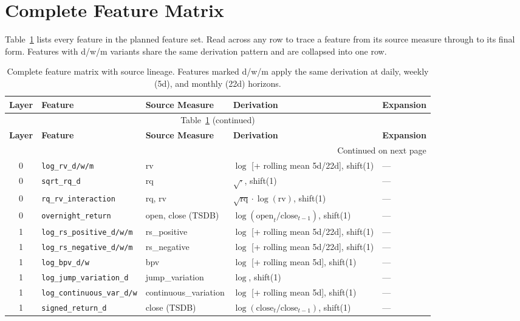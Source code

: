 \section{Complete Feature Matrix}
\label{sec:feature-matrix}

Table~\ref{tab:feature-matrix} lists every feature in the planned feature set.
Read across any row to trace a feature from its source measure through to its final form.
Features with d/w/m variants share the same derivation pattern and are collapsed into one row.

{\scriptsize
\begin{longtable}{@{}cl p{2.4cm} p{4.6cm} l@{}}
\caption{Complete feature matrix with source lineage.
Features marked d/w/m apply the same derivation at daily, weekly (5d), and monthly (22d) horizons.}
\label{tab:feature-matrix} \\
\toprule
\textbf{Layer} & \textbf{Feature} & \textbf{Source Measure} & \textbf{Derivation} & \textbf{Expansion} \\
\midrule
\endfirsthead
\multicolumn{5}{c}{\small Table~\ref{tab:feature-matrix} (continued)} \\
\toprule
\textbf{Layer} & \textbf{Feature} & \textbf{Source Measure} & \textbf{Derivation} & \textbf{Expansion} \\
\midrule
\endhead
\midrule \multicolumn{5}{r}{\small Continued on next page} \\
\endfoot
\bottomrule
\endlastfoot

0 & \texttt{log\_rv\_d/w/m} & rv & $\log$ [+ rolling mean 5d/22d], shift(1) & --- \\
0 & \texttt{sqrt\_rq\_d} & rq & $\sqrt{\cdot}$, shift(1) & --- \\
0 & \texttt{rq\_rv\_interaction} & rq, rv & $\sqrt{\text{rq}} \cdot \log(\text{rv})$, shift(1) & --- \\
0 & \texttt{overnight\_return} & open, close (TSDB) & $\log(\text{open}_t / \text{close}_{t-1})$, shift(1) & --- \\
\midrule

1 & \texttt{log\_rs\_positive\_d/w/m} & rs\_positive & $\log$ [+ rolling mean 5d/22d], shift(1) & --- \\
1 & \texttt{log\_rs\_negative\_d/w/m} & rs\_negative & $\log$ [+ rolling mean 5d/22d], shift(1) & --- \\
1 & \texttt{log\_bpv\_d/w} & bpv & $\log$ [+ rolling mean 5d], shift(1) & --- \\
1 & \texttt{log\_jump\_variation\_d} & jump\_variation & $\log$, shift(1) & --- \\
1 & \texttt{log\_continuous\_var\_d/w} & continuous\_variation & $\log$ [+ rolling mean 5d], shift(1) & --- \\
1 & \texttt{signed\_return\_d} & close (TSDB) & $\log(\text{close}_t / \text{close}_{t-1})$, shift(1) & --- \\
\midrule


\end{longtable}}
